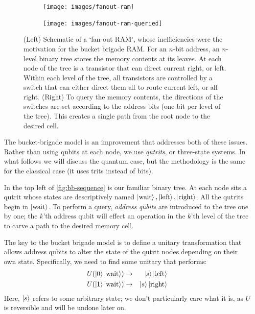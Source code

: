 \documentclass[a4paper,12pt]{article}
\begin{document}
\begin{figure}[ht!]
 \centering
  \captionsetup{width=.89\linewidth}
 \begin{subfigure}{0.45\textwidth}
    \centering
    \texttt{[image: images/fanout-ram]}
 \end{subfigure}
  \hspace{0.5cm}
  \begin{subfigure}{0.45\textwidth} 
    \centering
    \texttt{[image: images/fanout-ram-queried]}
 \end{subfigure} 
    \caption{(Left) Schematic of a `fan-out RAM', whose inefficiencies were the motivation for the bucket brigade RAM. 
    For an $n$-bit address, an $n$-level binary tree stores the memory contents at its leaves. 
    At each node of the tree is a transistor that can direct current right, or left. 
    Within each level of the tree, all transistors are controlled by a switch that can either direct them all to route current left, or all right. 
    (Right) To query the memory contents, the directions of the switches are set according to the address bits (one bit per level of the tree). 
    This creates a single path from the root node to the desired cell.}
    \label{fig:fanout-ram-sequence}
\end{figure}

The bucket-brigade model is an improvement that addresses both of these issues.
Rather than using qubits at each node, we use \emph{qutrits}, or three-state systems. 
In what follows we will discuss the quantum case, but the methodology is the same for the classical case (it uses trits instead of bits).

In the top left of \autoref{fig:bb-sequence} is our familiar binary tree. 
At each node sits a qutrit whose states are descriptively named $\ket{\hbox{wait}}, \ket{\hbox{left}}, \ket{\hbox{right}}$. 
All the qutrits begin in $\ket{\hbox{wait}}$. 
To perform a query, \emph{address qubits} are introduced to the tree one by one; the $k$'th address qubit will effect an operation in the $k$'th level of the tree to carve a path to the desired memory cell.

The key to the bucket brigade model is to define a unitary transformation that allows address qubits to alter the state of the qutrit nodes depending on their own state. 
Specifically, we need to find some unitary that performs:
\begin{eqnarray}
 U(\ket{0}\ket{\hbox{wait}}) &\rightarrow& \ket{s}\ket{\hbox{left}} \\
 U(\ket{1}\ket{\hbox{wait}}) &\rightarrow& \ket{s}\ket{\hbox{right}}
\end{eqnarray}
Here, $\ket{s}$ refers to some arbitrary state; we don't particularly care what it is, as $U$ is reversible and will be undone later on.
\end{document}
